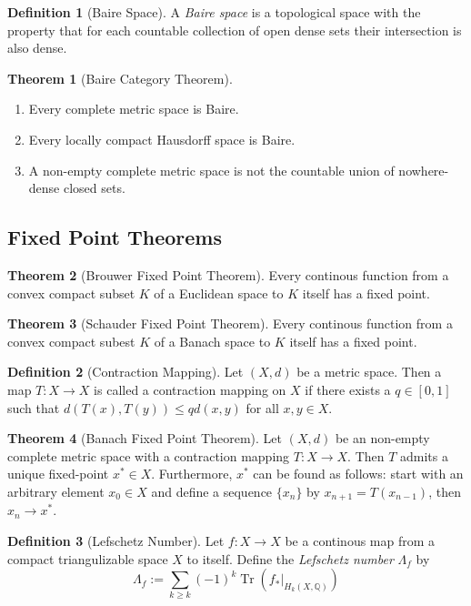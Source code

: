 \documentclass[a4paper]{article}
\newcommand{\QQ}{\mathbb{Q}}
\newcommand{\lra}{\longrightarrow}
\newcommand{\Trace}{\operatorname{Tr}}
\theoremstyle{definition}
\newtheorem{thm}{Theorem}
\theoremstyle{definition}
\newtheorem{definition}{Definition}
\theoremstyle{remark}
\theoremstyle{remark}
\begin{document}
\begin{definition}[Baire Space]
  A \emph{Baire space} is a topological space with the property that for each countable collection of open dense sets their intersection is also dense.
\end{definition}

\begin{thm}[Baire Category Theorem]
  \begin{enumerate}
    \item Every complete metric space is Baire.
    \item Every locally compact Hausdorff space is Baire.
    \item A non-empty complete metric space is not the countable union of nowhere-dense closed sets.
  \end{enumerate}
\end{thm}

\subsection{Fixed Point Theorems}

\begin{thm}[Brouwer Fixed Point Theorem]
  Every continous function from a convex compact subset $K$ of a Euclidean space to $K$ itself has a fixed point.
\end{thm}

\begin{thm}[Schauder Fixed Point Theorem]
  Every continous function from a convex compact subest $K$ of a Banach space to $K$ itself has a fixed point.
\end{thm}

\begin{definition}[Contraction Mapping]
  Let $(X,d)$ be a metric space. Then a map $T:X\lra X$ is called a contraction mapping on $X$ if there exists a $q\in[0,1]$ such that $d(T(x),T(y))\leq qd(x,y)$ for all $x,y\in X$.
\end{definition}

\begin{thm}[Banach Fixed Point Theorem]
  Let $(X,d)$ be an non-empty complete metric space with a contraction mapping $T:X\lra X$. Then $T$ admits a unique fixed-point $x^*\in X$. Furthermore, $x^*$ can be found as follows: start with an arbitrary element $x_0\in X$ and define a sequence $\{x_n\}$ by $x_{n+1}=T(x_{n-1})$, then $x_n\lra x^*$.
\end{thm}

\begin{definition}[Lefschetz Number]
  Let $f:X\lra X$ be a continous map from a compact triangulizable space $X$ to itself. Define the \emph{Lefschetz number} $\Lambda_f$ by
  \begin{equation*}
    \Lambda_f:=\sum_{k\geq k}(-1)^k\Trace(f_*|_{H_k(X,\QQ)})
  \end{equation*}
\end{definition}
\end{document}
